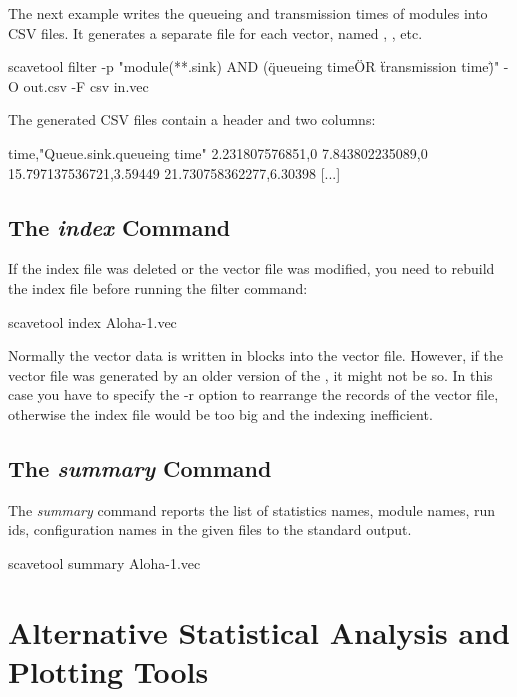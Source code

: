 The next example writes the queueing and transmission times of 
modules into CSV files. It generates a separate file for each vector,
named , , etc.

\begin{commandline}
scavetool filter -p "module(**.sink) AND
                    (\"queueing time\" OR \"transmission time\")"
                 -O out.csv -F csv in.vec
\end{commandline}

The generated CSV files contain a header and two columns:

\begin{filelisting}
time,"Queue.sink.queueing time"
2.231807576851,0
7.843802235089,0
15.797137536721,3.59449
21.730758362277,6.30398
[...]
\end{filelisting}


\subsection{The \textit{index} Command}

If the index file was deleted or the vector file was modified, you need to
rebuild the index file before running the filter command:

\begin{commandline}
scavetool index Aloha-1.vec
\end{commandline}

Normally the vector data is written in blocks into the vector file.
However, if the vector file was generated by an older version of the
, it might not be so. In this case you have
to specify the -r option to rearrange the records of the vector file,
otherwise the index file would be too big and the indexing inefficient.

\subsection{The \textit{summary} Command}

The \textit{summary} command reports the list of statistics names, module names,
run ids, configuration names in the given files to the standard output.

\begin{commandline}
scavetool summary Aloha-1.vec
\end{commandline}


\section{Alternative Statistical Analysis and Plotting Tools}
\label{sec:ana-sim:alt-tools}

